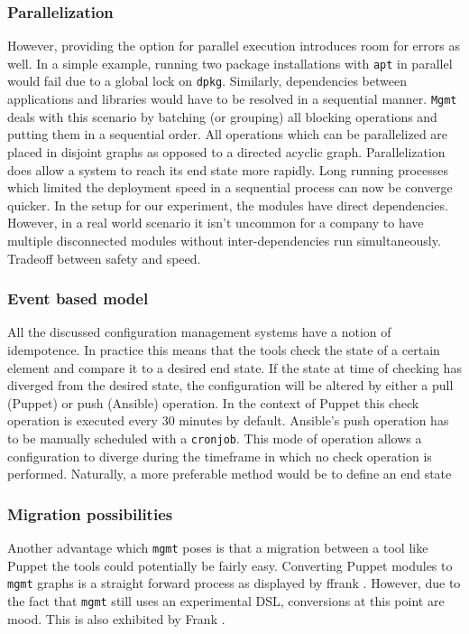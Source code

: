 \subsubsection{Parallelization}
However, providing the option for parallel execution introduces room for errors as well. In a simple example, running two package installations with \texttt{apt} in parallel would fail due to a global lock on \texttt{dpkg}. Similarly, dependencies between applications and libraries would have to be resolved in a sequential manner. \texttt{Mgmt} deals with this scenario by batching (or grouping) all blocking operations and putting them in a sequential order. All operations which can be parallelized are placed in disjoint graphs as opposed to a directed acyclic graph. Parallelization does allow a system to reach its end state more rapidly. Long running processes which limited the deployment speed in a sequential process can now be converge quicker. In the setup for our experiment, the modules have direct dependencies. However, in a real world scenario it isn't uncommon for a company to have multiple disconnected modules without inter-dependencies run simultaneously. Tradeoff between safety and speed. 


\subsubsection{Event based model}
All the discussed configuration management systems have a notion of idempotence. In practice this means that the tools check the state of a certain element and compare it to a desired end state. If the state at time of checking has diverged from the desired state, the configuration will be altered by either a pull (Puppet) or push (Ansible) operation. In the context of Puppet this check operation is executed every 30 minutes by default. Ansible's push operation has to be manually scheduled with a \texttt{cronjob}. This mode of operation allows a configuration to diverge during the timeframe in which no check operation is performed. Naturally, a more preferable method would be to define an end state 

\subsubsection{Migration possibilities}
Another advantage which \texttt{mgmt} poses is that a migration between a tool like Puppet the tools could potentially be fairly easy. Converting Puppet modules to \texttt{mgmt} graphs is a straight forward process as displayed by ffrank \cite{}. However, due to the fact that \texttt{mgmt} still uses an experimental DSL, conversions at this point are mood. This is also exhibited by Frank \cite{}. 
